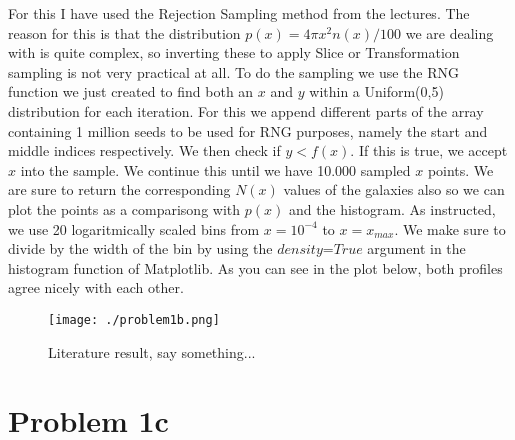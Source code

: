 For this I have used the Rejection Sampling method from the lectures. The reason for this is that the distribution $p(x) = 4\pi x^2 n(x)/100$ we are dealing with is quite complex, so inverting these to apply Slice or Transformation sampling is not very practical at all. To do the sampling we use the RNG function we just created to find both an $x$ and $y$ within a Uniform(0,5) distribution for each iteration. For this we append different parts of the array containing 1 million seeds to be used for RNG purposes, namely the start and middle indices respectively. We then check if $y < f(x)$. If this is true, we accept $x$ into the sample. We continue this until we have 10.000 sampled $x$ points. We are sure to return the corresponding $N(x)$ values of the galaxies also so we can plot the points as a comparisong with $p(x)$ and the histogram. As instructed, we use 20 logaritmically scaled bins from $x = 10^{-4}$ to $x = x_{max}$. We make sure to divide by the width of the bin by using the $\textit{density=True}$ argument in the histogram function of Matplotlib. As you can see in the plot below, both profiles agree nicely with each other. 

\begin{figure}[h!]
  \centering
  \texttt{[image: ./problem1b.png]}
  \caption{Literature result, say something...}
\end{figure}


\section*{Problem 1c}

